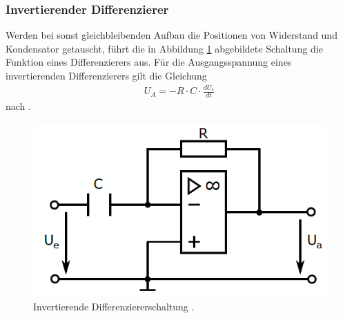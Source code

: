 \subsubsection{Invertierender Differenzierer}
\noindent Werden bei sonst gleichbleibenden Aufbau die Positionen von Widerstand
und Kondensator getauscht, führt die in Abbildung \ref{fig:05} abgebildete Schaltung
die Funktion eines Differenzierers aus. Für die Ausgangsspannung eines
invertierenden Differenzierers gilt die Gleichung
\begin{align}
  U_A = - R \cdot C \cdot \frac{d U_e}{dt}
  \label{eqn:08}
\end{align}
nach \cite{osnabrueck}.
\FloatBarrier
\begin{figure}
  \centering
  \includegraphics[scale=0.99]{ressources/figure_05.png}
  \caption{Invertierende Differenziererschaltung \cite{sample}.}
  \label{fig:05}
\end{figure}
\FloatBarrier
